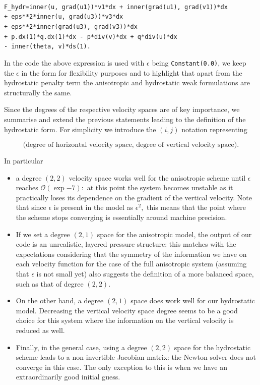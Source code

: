 \documentclass[12pt]{report}
\numberwithin{theorem}{chapter}
\numberwithin{corollary}{chapter}
\numberwithin{lemma}{chapter}
\numberwithin{remark}{chapter}
\numberwithin{definition}{chapter}
\numberwithin{prop}{chapter}
\begin{document}
\texttt{
\\
F\_hydr=inner(u, grad(u1))*v1*dx + inner(grad(u1), grad(v1))*dx \\
+ eps**2*inner(u, grad(u3))*v3*dx \\
+ eps**2*inner(grad(u3), grad(v3))*dx \\
+ p.dx(1)*q.dx(1)*dx - p*div(v)*dx + q*div(u)*dx\\
- inner(theta, v)*ds(1). \\
}

In the code the above expression is used with $\epsilon$ being \texttt{Constant(0.0)}, we keep the $\epsilon$ in the form for flexibility purposes and to highlight that apart from the hydrostatic penalty term the anisotropic and hydrostatic weak formulations are structurally the same.

Since the degrees of the respective velocity spaces are of key importance, we summarise and extend the previous statements leading to the definition of the hydrostatic form. For simplicity we introduce the $(i,j)$ notation representing

$$\text{(degree of horizontal velocity space, degree of vertical velocity space).}$$

In particular

\begin{itemize}
  \item a degree $(2,2)$ velocity space works well for the anisotropic scheme until $\epsilon$ reaches $\mathcal{O}(\exp{-7}):$ at this point the system becomes unstable as it practically loses its dependence on the gradient of the vertical velocity. Note that since $\epsilon$ is present in the model as $\epsilon^2,$ this means that the point where the scheme stops converging is essentially around machine precision.
  \item If we set a degree $(2,1)$ space for the anisotropic model, the output of our code is an unrealistic, layered pressure structure: this matches with the expectations considering that the symmetry of the information we have on each velocity function for the case of the full anisotropic system (assuming that $\epsilon$ is not small yet) also suggests the definition of a more balanced space, such as that of degree $(2,2)$.
  \item On the other hand, a degree $(2,1)$ space does work well for our hydrostatic model. Decreasing the vertical velocity space degree seems to be a good choice for this system where the information on the vertical velocity is reduced as well.
  \item Finally, in the general case, using a degree $(2,2)$ space for the hydrostatic scheme leads to a non-invertible Jacobian matrix: the Newton-solver does not converge in this case. The only exception to this is when we have an extraordinarily good initial guess.
\end{itemize}
\end{document}

